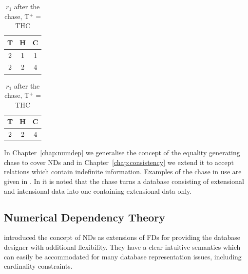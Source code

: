 {\line
\begin{table}[ht]
\begin{minipage}[b]{6cm}
\begin{center}
\begin{tabular}{|c|c|c|} \hline
 T & H & C \\ \hline
 2 & 1 & 1 \\
 2 & 2 & 4 \\  \hline
\end{tabular}
\end{center}
\caption{\label{tab:befcha}$r_{1}$ before the chase}
\end{minipage}
\hfill
\begin{minipage}[b]{6cm}
\begin{center}
\begin{tabular}{|c|c|c|} \hline
 T & H & C \\ \hline
 2 & 2 & 4 \\  \hline
\end{tabular}
\end{center}
\caption{\label{tab:aftcha}$r_{1}$ after the chase, T$^+$ = THC}
\end{minipage}
\end{table}
}

In Chapter~\ref{chap:numdep} we generalise the concept of
the equality generating chase to cover NDs and in Chapter~\ref{chap:consistency} we extend it
to accept relations which contain indefinite information. Examples of
the chase in use are given in \cite{databasefound,Mann92}. In
\cite{ler86} it is noted that the chase turns a database consisting of
extensional and intensional data into one containing extensional data only.


\subsection{Numerical Dependency Theory}\label{subsec:rev_ndtheory}

\cite{gm85a,gm85b} introduced the concept of NDs as
extensions of FDs for providing the database designer
with additional flexibility.  They have a clear intuitive semantics
which can easily be accommodated for many database representation
issues, including cardinality constraints.


